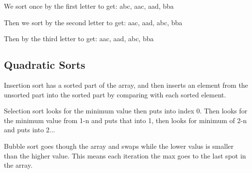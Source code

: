 \documentclass[12pt,letterpaper]{article} \usepackage{amsmath} \usepackage{graphicx} \usepackage[margin=1in]{geometry} \usepackage{longtable}  \usepackage{amssymb}
\begin{document}
	We sort once by the first letter to get: abc, aac, aad, bba
	
	Then we sort by the second letter to get: aac, aad, abc, bba
	
	Then by the third letter to get: aac, aad, abc, bba
	
	\subsection{Quadratic Sorts}
	Insertion sort has a sorted part of the array, and then inserts an element from the unsorted part into the sorted part by comparing with each sorted element. 
	
	Selection sort looks for the minimum value then puts into index 0. Then looks for the minimum value from 1-n and puts that into 1, then looks for minimum of 2-n and puts into 2...
	
	Bubble sort goes though the array and swaps while the lower valus is smaller than the higher value. This means each iteration the max goes to the last spot in the array.
	
	
	
	
	
	
	
\end{document}
